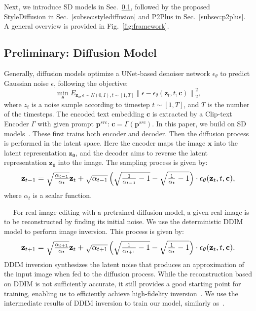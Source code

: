 \documentclass[twocolumn]{svjour3}          \smartqed  \usepackage{graphicx}
\newcommand{\minisection}[1]{\vspace{0.04in} \noindent {\bf #1}\ \ }
\begin{document}
Next, we  introduce SD models in Sec.~\ref{subsec:SD_models}, followed by the proposed StyleDiffusion in Sec.~\ref{subsec:stylediffusion} and P2Plus in Sec.~\ref{subsec:p2plus}. A general overview is provided in Fig.~\ref{fig:framework}.


\subsection{Preliminary: Diffusion Model}\label{subsec:SD_models}
Generally, diffusion models optimize a UNet-based denoiser  network $\epsilon_\theta$  to predict Gaussian noise $\epsilon$,  following the objective:
\begin{equation}
\min_\theta E_{\mathbf{z}_0,\epsilon \sim N(0,I),t\sim [1,T]} \left \| \epsilon-\epsilon_\theta(\mathbf{z}_t,t,\mathbf{c}) \right \|_{2}^{2}, 
\end{equation}
where $z_t$ is a noise sample according to timestep $t\sim [1,T]$, and $T$ is the number of the timesteps.  The encoded text embedding $\mathbf{c}$ is extracted by a Clip-text Encoder $\Gamma$ with given prompt $\mathbf{p}^{src}$: $\mathbf{c} = \Gamma(\mathbf{p}^{src})$. 
In this paper, we  build on SD models~\citep{rombach2021highresolution}.  These first trains both encoder  and decoder. Then the diffusion process is performed in the latent space. Here the encoder maps the image $\mathbf{x}$ into the latent representation  $\mathbf{z_0}$, and the decoder aims to reverse the  latent representation  $\mathbf{z_0}$ into the image.  The sampling process is given by:
\begin{equation}
\resizebox{0.9\hsize}{!}{$\mathbf{z}_{t-1} = \sqrt{\frac{\alpha_{t-1}}{\alpha_t}}\mathbf{z}_t 
+\sqrt{\alpha_{t-1}}
\left(\sqrt{\frac{1}{\alpha_{t-1}}-1}-\sqrt{\frac{1}{\alpha_t}-1}\right) \cdot \epsilon_\theta(\mathbf{z}_t,t,\mathbf{c}),
$}
\label{eq:ddim_sampling}
\end{equation}
 where  $\alpha_t$ is a scalar function.


\minisection{DDIM inversion.} For real-image editing with a pretrained diffusion model, a given real image is to be reconstructed by finding its initial noise. 
 We use the deterministic DDIM model to perform image inversion.  
 This process is given by:
\begin{equation}
\label{eq:ddim_inversion}
\resizebox{0.9\hsize}{!}{$\mathbf{z}_{t+1} = \sqrt{\frac{\alpha_{t+1}}{\alpha_t}}\mathbf{z}_t \\
+ \sqrt{\alpha_{t+1}}
\left(\sqrt{\frac{1}{\alpha_{t+1}}-1}-\sqrt{\frac{1}{\alpha_t}-1}\right)\cdot \epsilon_\theta(\mathbf{z}_t,t,\mathbf{c}).
$}
\end{equation}
 DDIM inversion synthesizes the latent noise that produces an approximation of the input image when fed to the diffusion process. While the reconstruction based on DDIM is not sufficiently accurate,  it still provides a good starting point for training, enabling us to efficiently achieve high-fidelity  inversion~\citep{hertz2022prompt}. We use  the intermediate results of DDIM inversion to train our model, similarly as~\citep{couairon2022diffedit,mokady2022null}.
\end{document}
